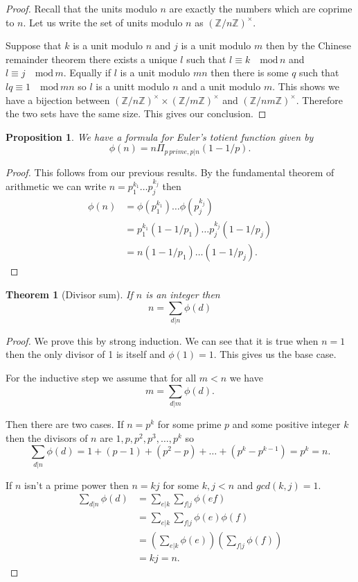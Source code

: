 \documentclass[
]{book}
\newtheorem{theorem}{Theorem}[chapter]
\newtheorem{proposition}{Proposition}[chapter]
\theoremstyle{definition}
\theoremstyle{definition}
\theoremstyle{definition}
\theoremstyle{definition}
\theoremstyle{remark}
\begin{document}
\begin{proof}
Recall that the units modulo \(n\) are exactly the numbers which are coprime to \(n\). Let us write the set of units modulo \(n\) as \(\left(\mathbb{Z}/n \mathbb{Z} \right)^{\times}\).

Suppose that \(k\) is a unit modulo \(n\) and \(j\) is a unit modulo \(m\) then by the Chinese remainder theorem there exists a unique \(l\) such that \(l \equiv k \quad \mbox{mod} \, n\) and \(l \equiv j \quad \mbox{mod} \, m\). Equally if \(l\) is a unit modulo \(mn\) then there is some \(q\) such that \(lq \equiv 1 \quad \mbox{mod}\, mn\) so \(l\) is a unitt modulo \(n\) and a unit modulo \(m\). This shows we have a bijection between \(\left(\mathbb{Z}/n \mathbb{Z} \right)^{\times} \times \left(\mathbb{Z}/m \mathbb{Z} \right)^{\times}\) and \(\left(\mathbb{Z}/nm \mathbb{Z} \right)^{\times}\). Therefore the two sets have the same size. This gives our conclusion.
\end{proof}

\begin{proposition}
We have a formula for Euler's totient function given by
\[ \phi(n) = n \Pi_{p \, prime, p|n} (1-1/p).  \]
\end{proposition}

\begin{proof}
This follows from our previous results. By the fundamental theorem of arithmetic we can write \(n = p_1^{k_1} \dots p_j^{k_j}\) then
\begin{align*} \phi(n) &= \phi(p_1^{k_1}) \dots \phi(p_j^{k_j})  \\
& = p_1^{k_1}(1-1/p_1) \dots p_j^{k_j}(1-1/p_j) \\
& = n (1-1/p_1) \dots (1-1/p_j).
\end{align*}
\end{proof}

\begin{theorem}[Divisor sum]
If \(n\) is an integer then
\[ n = \sum_{d|n} \phi(d)  \]
\end{theorem}

\begin{proof}
We prove this by strong induction. We can see that it is true when \(n=1\) then the only divisor of 1 is itself and \(\phi(1) =1\). This gives us the base case.

For the inductive step we assume that for all \(m < n\) we have
\[ m = \sum_{d|m} \phi(d).  \]

Then there are two cases. If \(n= p^k\) for some prime \(p\) and some positive integer \(k\) then the divisors of \(n\) are \(1,p, p^2, p^3, \dots, p^k\) so
\[ \sum_{d|n} \phi(d) = 1 + (p-1) +(p^2-p) + \dots +(p^k - p^{k-1}) = p^k =n.  \]

If \(n\) isn't a prime power then \(n=kj\) for some \(k, j < n\) and \(gcd(k,j)=1\).
\begin{align*} \sum_{d|n} \phi(d) &=  \sum_{e|k} \sum_{f|j} \phi(ef)  \\
& = \sum_{e|k} \sum_{f|j}\phi(e)\phi(f)\\
&= \left(\sum_{e|k} \phi(e)\right)\left(\sum_{f|j} \phi(f)\right)\\
& = kj = n. 
\end{align*}
\end{proof}
\end{document}
